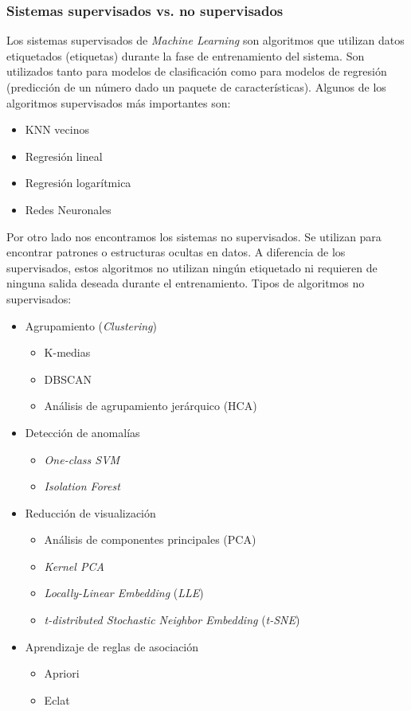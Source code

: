 \documentclass[12pt,a4paper,Spanish]{article}
\begin{document}
\subsubsection{Sistemas supervisados vs. no supervisados}
Los sistemas supervisados de \textit{Machine Learning} son algoritmos que utilizan datos etiquetados (etiquetas) durante la fase de entrenamiento del sistema. Son utilizados tanto para modelos de clasificación como para modelos de regresión (predicción de un número dado un paquete de características). Algunos de los algoritmos supervisados más importantes son:
\begin{itemize}
	\item KNN vecinos
	\item Regresión lineal
	\item Regresión logarítmica
	\item Redes Neuronales	
\end{itemize}
Por otro lado nos encontramos los sistemas no supervisados. Se utilizan para encontrar patrones o estructuras ocultas en datos. A diferencia de los supervisados, estos algoritmos no utilizan ningún etiquetado ni requieren de ninguna salida deseada durante el entrenamiento. Tipos de algoritmos no supervisados:
\begin{itemize}
	\item Agrupamiento (\textit{Clustering})
	\begin{itemize}
		\item K-medias
		\item DBSCAN
		\item Análisis de agrupamiento jerárquico (HCA)	
	\end{itemize}
	\item Detección de anomalías
	\begin{itemize}
		\item \textit{One-class SVM}
		\item \textit{Isolation Forest}	
	\end{itemize}
	\item Reducción de visualización
	\begin{itemize}
		\item Análisis de componentes principales (PCA)
		\item \textit{Kernel PCA}	
		\item \textit{Locally-Linear Embedding} (\textit{LLE})
		\item \textit{t-distributed Stochastic Neighbor Embedding} (\textit{t-SNE})
	\end{itemize}
	\item Aprendizaje de reglas de asociación
	\begin{itemize}
		\item Apriori
		\item Eclat	
	\end{itemize}	
\end{itemize}
\end{document}
